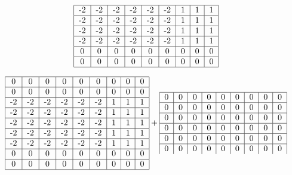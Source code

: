 \documentclass{article}
\begin{document}
\begin{equation}
\begin{tabular}{ | c | c | c | c | c | c | c | c | c | }
        \hline
        -2 & -2 & -2 & -2 & -2 & -2 & 1 & 1 & 1 \\ 
        \hline
        -2 & -2 & -2 & -2 & -2 & -2 & 1 & 1 & 1 \\ 
        \hline
        -2 & -2 & -2 & -2 & -2 & -2 & 1 & 1 & 1 \\ 
        \hline
        -2 & -2 & -2 & -2 & -2 & -2 & 1 & 1 & 1 \\ 
        \hline
        0 & 0 & 0 & 0 & 0 & 0 & 0 & 0 & 0 \\ 
        \hline
        0 & 0 & 0 & 0 & 0 & 0 & 0 & 0 & 0 \\ 
        \hline
    \end{tabular}
\end{equation}

\begin{equation}
    \begin{tabular}{ | c | c | c | c | c | c | c | c | c | }
        \hline
        0 & 0 & 0 & 0 & 0 & 0 & 0 & 0 & 0 \\ 
        \hline
        0 & 0 & 0 & 0 & 0 & 0 & 0 & 0 & 0 \\ 
        \hline
        -2 & -2 & -2 & -2 & -2 & -2 & 1 & 1 & 1 \\ 
        \hline
        -2 & -2 & -2 & -2 & -2 & -2 & 1 & 1 & 1 \\ 
        \hline
        -2 & -2 & -2 & -2 & -2 & -2 & 1 & 1 & 1 \\ 
        \hline
        -2 & -2 & -2 & -2 & -2 & -2 & 1 & 1 & 1 \\ 
        \hline
        -2 & -2 & -2 & -2 & -2 & -2 & 1 & 1 & 1 \\ 
        \hline
        0 & 0 & 0 & 0 & 0 & 0 & 0 & 0 & 0 \\ 
        \hline
        0 & 0 & 0 & 0 & 0 & 0 & 0 & 0 & 0 \\ 
        \hline
    \end{tabular} +
    \begin{tabular}{ | c | c | c | c | c | c | c | c | c | }
        \hline
        0 & 0 & 0 & 0 & 0 & 0 & 0 & 0 & 0 \\ 
        \hline
        0 & 0 & 0 & 0 & 0 & 0 & 0 & 0 & 0 \\ 
        \hline
        0 & 0 & 0 & 0 & 0 & 0 & 0 & 0 & 0 \\ 
        \hline
        0 & 0 & 0 & 0 & 0 & 0 & 0 & 0 & 0 \\ 
        \hline
        0 & 0 & 0 & 0 & 0 & 0 & 0 & 0 & 0 \\ 
        \hline
        0 & 0 & 0 & 0 & 0 & 0 & 0 & 0 & 0 \\ 

\end{tabular}
\end{equation}
\end{document}
